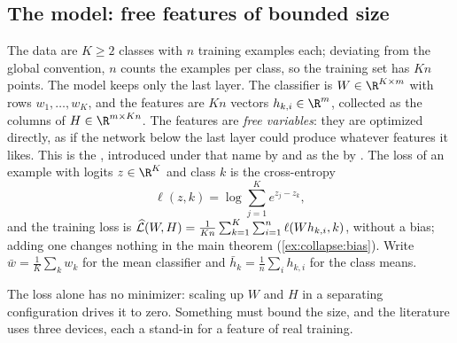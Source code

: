 \begin{refsection}
\section{The model: free features of bounded size}\label{sec:collapse:model}

The data are $K\ge2$ classes with $n$ training examples each; deviating from the global convention, $n$ counts the examples per class, so the training set has $Kn$ points. The model keeps only the last layer. The classifier is $W\in\R^{K\times m}$ with rows $w_1,\dots,w_K$, and the features are $Kn$ vectors $h_{k,i}\in\R^m$, collected as the columns of $H\in\R^{m\times Kn}$. The features are \emph{free variables}: they are optimized directly, as if the network below the last layer could produce whatever features it likes. This is the , introduced under that name by \textcite{MixonParshallPi2020} and as the  by \textcite{FangEtAl2021}. The loss of an example with logits $z\in\R^K$ and class $k$ is the cross-entropy
\[
  \ell(z,k)=\log\sum_{j=1}^Ke^{z_j-z_k},
\]
and the training loss is $\widehat{\mathcal{L}}(W,H)=\frac1{Kn}\sum_{k=1}^K\sum_{i=1}^n\ell(Wh_{k,i},k)$, without a bias; adding one changes nothing in the main theorem (\cref{ex:collapse:bias}). Write $\bar w=\frac1K\sum_kw_k$ for the mean classifier and $\bar h_k=\frac1n\sum_ih_{k,i}$ for the class means.

The loss alone has no minimizer: scaling up $W$ and $H$ in a separating configuration drives it to zero. Something must bound the size, and the literature uses three devices, each a stand-in for a feature of real training.



\end{refsection}
